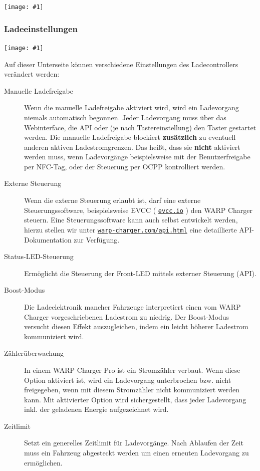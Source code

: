 \documentclass[a4paper,10pt]{article}
\newcommand{\gfx}[1]{\texttt{[image: \#1]}}
\newcommand\rurl[2]{%
  \href{#1}{\nolinkurl{#2}}%
}
\begin{document}
\begin{multicols*}{2}
    \gfx{./img_warp2/resized/web_evse2}

    \subsubsection{Ladeeinstellungen}\label{evse-settings}
    \gfx{./img_warp2/resized/web_evse2_settings}

    Auf dieser Unterseite können verschiedene Einstellungen des Ladecontrollers verändert werden:

    \begin{description}
     \item[Manuelle Ladefreigabe] Wenn die manuelle Ladefreigabe aktiviert wird, wird ein Ladevorgang niemals automatisch begonnen. Jeder Ladevorgang muss über das Webinterface, die API oder (je nach Tastereinstellung) den Taster gestartet werden. Die manuelle Ladefreigabe blockiert \textbf{zusätzlich} zu eventuell anderen aktiven Ladestromgrenzen. Das heißt, dass sie \textbf{nicht} aktiviert werden muss, wenn Ladevorgänge beispielsweise mit der Benutzerfreigabe per NFC-Tag, oder der Steuerung per OCPP kontrolliert werden.
     \item[Externe Steuerung] Wenn die externe Steuerung erlaubt ist, darf eine externe Steuerungssoftware, beispielsweise
     EVCC (\rurl{https://evcc.io}{evcc.io}) den WARP Charger steuern. Eine Steuerungssoftware kann auch selbst entwickelt werden, hierzu stellen
     wir unter \rurl{https://warp-charger.com/api.html}{warp-charger.com/api.html} eine detaillierte API-Dokumentation zur Verfügung.
     \item[Status-LED-Steuerung] Ermöglicht die Steuerung der Front-LED mittels externer Steuerung (API).
     \item[Boost-Modus] Die Ladeelektronik mancher Fahrzeuge interpretiert einen vom WARP Charger vorgeschriebenen Ladestrom zu niedrig. Der Boost-Modus versucht diesen Effekt auszugleichen, indem ein leicht höherer Ladestrom kommuniziert wird.
     \item[Zählerüberwachung] In einem WARP Charger Pro ist ein Stromzähler verbaut. Wenn diese Option aktiviert ist, wird ein Ladevorgang unterbrochen bzw. nicht freigegeben, wenn mit diesem Stromzähler nicht kommuniziert werden kann. Mit aktivierter Option wird sichergestellt, dass jeder Ladevorgang inkl. der geladenen Energie aufgezeichnet wird.
     \item[Zeitlimit] Setzt ein generelles Zeitlimit für Ladevorgänge. Nach Ablaufen der Zeit muss ein Fahrzeug abgesteckt werden um einen erneuten Ladevorgang zu ermöglichen.

\end{description}
\end{multicols*}
\end{document}
